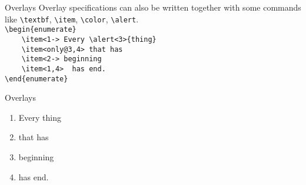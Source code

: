 \begin{frame}[fragile]{Overlays\magicPage}
    Overlay specifications can also be written together with some commands like 
    \lstinline[basicstyle=\tt]|\textbf|,
    \lstinline[basicstyle=\tt]|\item|,
    \lstinline[basicstyle=\tt]|\color|,
    \lstinline[basicstyle=\tt]|\alert|. \\
    \pause
    \lstinline[basicstyle=\tt]|\begin{enumerate}| \\
    \lstinline[basicstyle=\tt]|    \item<1-> Every \alert<3>{thing}|   \\
    \lstinline[basicstyle=\tt]|    \item<only@3,4> that has|   \\
    \lstinline[basicstyle=\tt]|    \item<2-> beginning| \\
    \lstinline[basicstyle=\tt]|    \item<1,4>  has end.|   \\
    \lstinline[basicstyle=\tt]|\end{enumerate}|
\end{frame}

\begin{frame}{Overlays\magicPage}
    \begin{enumerate}
        \item<1-> Every \alert<3>{thing}
        \item<only@3,4> that has
        \item<2-> beginning
        \item<1,4> has end.
    \end{enumerate}
\end{frame}


